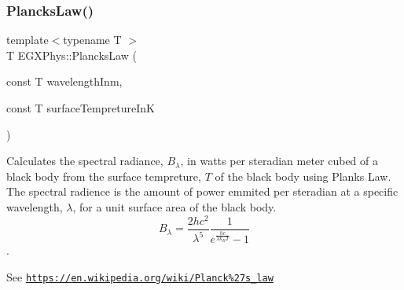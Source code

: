 \subsubsection{\texorpdfstring{Plancks\+Law()}{PlancksLaw()}}
{\footnotesize\ttfamily template$<$typename T $>$ \\
T E\+G\+X\+Phys\+::\+Plancks\+Law (\begin{DoxyParamCaption}\item[{const T}]{wavelength\+Inm,  }\item[{const T}]{surface\+Tempreture\+InK }\end{DoxyParamCaption})}



Calculates the spectral radiance, $B_{\lambda}$, in watts per steradian meter cubed of a black body from the surface tempreture, $T$ of the black body using Plank\textquotesingle{}s Law. The spectral radience is the amount of power emmited per steradian at a specific wavelength, $\lambda$, for a unit surface area of the black body. \[ B_{\lambda} = \dfrac{2 h c^2}{\lambda^5} \dfrac{1}{e^{\frac{hc}{\lambda k_B T}} - 1} \]. 

See \href{https://en.wikipedia.org/wiki/Planck%27s_law}{\tt https\+://en.\+wikipedia.\+org/wiki/\+Planck\%27s\+\_\+law}


